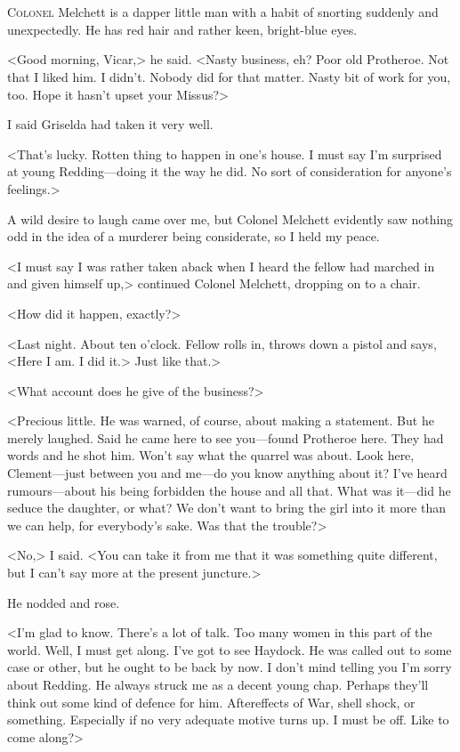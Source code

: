 \chapter[Chapter  \thechapter]{}


\lettrine{C}{olonel} Melchett is a dapper little man with a habit of snorting suddenly and unexpectedly. He has red hair and rather keen, bright-blue eyes.

\zz
<Good morning, Vicar,> he said. <Nasty business, eh? Poor old Protheroe. Not that I liked him. I didn't. Nobody did for that matter. Nasty bit of work for you, too. Hope it hasn't upset your Missus?>

I said Griselda had taken it very well.

<That's lucky. Rotten thing to happen in one's house. I must say I'm surprised at young Redding—doing it the way he did. No sort of consideration for anyone's feelings.>

A wild desire to laugh came over me, but Colonel Melchett evidently saw nothing odd in the idea of a murderer being considerate, so I held my peace.

<I must say I was rather taken aback when I heard the fellow had marched in and given himself up,> continued Colonel Melchett, dropping on to a chair.

<How did it happen, exactly?>

<Last night. About ten o'clock. Fellow rolls in, throws down a pistol and says, <Here I am. I did it.> Just like that.>

<What account does he give of the business?>

<Precious little. He was warned, of course, about making a statement. But he merely laughed. Said he came here to see you—found Protheroe here. They had words and he shot him. Won't say what the quarrel was about. Look here, Clement—just between you and me—do you know anything about it? I've heard rumours—about his being forbidden the house and all that. What was it—did he seduce the daughter, or what? We don't want to bring the girl into it more than we can help, for everybody's sake. Was that the trouble?>

<No,> I said. <You can take it from me that it was something quite different, but I can't say more at the present juncture.>

He nodded and rose.

<I'm glad to know. There's a lot of talk. Too many women in this part of the world. Well, I must get along. I've got to see Haydock. He was called out to some case or other, but he ought to be back by now. I don't mind telling you I'm sorry about Redding. He always struck me as a decent young chap. Perhaps they'll think out some kind of defence for him. Aftereffects of War, shell shock, or something. Especially if no very adequate motive turns up. I must be off. Like to come along?>

